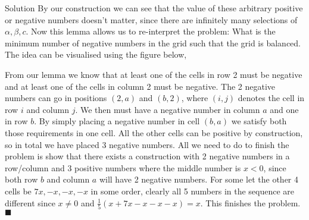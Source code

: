 \documentclass{article}
\begin{document}
\begin{solution}{Solution}
By our construction we can see that the value of these arbitrary positive
or negative numbers doesn't matter, since there are infinitely many
selections of $\alpha, \beta, c$. Now this lemma allows us to re-interpret
the problem: What is the minimum number of negative numbers in the grid
such that the grid is balanced. The idea can be visualised using the figure
below,

\begin{center}
\end{center}

From our lemma we know that at least one of the cells in row 2 must be
negative and at least one of the cells in column 2 must be negative. The
2 negative numbers can go in positions $(2, a)$ and $(b, 2)$, where
$(i, j)$ denotes the cell in row $i$ and column $j$. We then must have
a negative number in column $a$ and one in row $b$. By simply placing a
negative number in cell $(b, a)$ we satisfy both those requirements in one
cell. All the other cells can be positive by construction, so in total we
have placed 3 negative numbers. All we need to
do to finish the problem is show that there exists a construction with
2 negative numbers in a row/column and 3 positive numbers where the middle
number is $x < 0$, since both row $b$ and column $a$ will have 2 negative
numbers. For some let the other 4 cells be $7x, -x, -x, -x$ in some order,
clearly all 5 numbers in the sequence are different since $x\neq 0$ and
$\frac{1}{5}(x+7x-x-x-x) = x$. This finishes the problem. $\blacksquare$
\end{solution}
\end{document}
